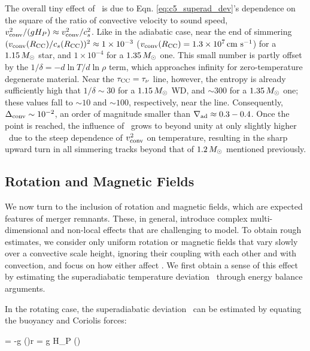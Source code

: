 The overall tiny effect of \dnabconv\ is due to Eqn. \ref{eq:c5_superad_dev}'s dependence on the square of the ratio of convective velocity to sound speed, $\vconv^2/(g H_P) \approx \vconv^2/c_s^2$.  Like in the adiabatic case, near the end of simmering $(\vconvrcc/c_s(\Rcc))^2 \approx 1\times10^{-3}$ ($\vconvrcc = 1.3\times10^7\,\cmpsec$) for a $1.15\,\Msun$ star, and $1\times10^{-4}$ for a $1.35\,\Msun$ one.  This small number is partly offset by the $1/\delta = -d\ln T/d\ln \rho$ term, which approaches infinity for zero-temperature degenerate material.  Near the $\taucc = \taunu$ line, however, the entropy is already sufficiently high that $1/\delta \sim 30$ for a $1.15\,\Msun$ WD, and $\sim 300$ for a $1.35\,\Msun$ one; these values fall to $\sim 10$ and $\sim 100$, respectively, near the \citeal{wooswk04} line.  Consequently, $\dnabconv \sim 10^{-2}$, an order of magnitude smaller than $\nablaad \approx 0.3 - 0.4$.  Once the \citeal{wooswk04} point is reached, the influence of \dnabconv\ grows to beyond unity at only slightly higher \Sc\ due to the steep dependence of $\vconv^2$ on temperature, resulting in the sharp upward turn in all simmering tracks beyond that of $1.2\,\Msun$ mentioned previously.

\subsection{Rotation and Magnetic Fields}
\label{ssec:c5_rotmag}


We now turn to the inclusion of rotation and magnetic fields, which are expected features of merger remnants.  These, in general, introduce complex multi-dimensional and non-local effects that are challenging to model.  To obtain rough estimates, we consider only uniform rotation or magnetic fields that vary slowly over a convective scale height, ignoring their coupling with each other and with convection, and focus on how either affect \Mcrit.  We first obtain a sense of this effect by estimating the superadiabatic temperature deviation \deltanab\ through energy balance arguments.

In the rotating case, the superadiabatic deviation \dnabrot\ can be estimated by equating the buoyancy and Coriolis forces:

\rho\Omega\vconv = -g \left(\right)\Delta r = g H_P \rho \left(\dnabrot\right)
\label{eq:c5_dnabrot_est_work}
\eqend

